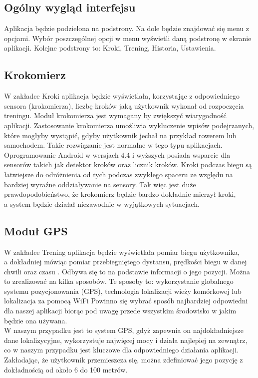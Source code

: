 \subsection{Ogólny wygląd interfejsu}  %

\hspace{0.60cm}Aplikacja będzie podzielona na podstrony. Na dole będzie znajdować się menu z opcjami. Wybór poszczególnej opcji w menu wyświetli daną podstronę w ekranie aplikacji. Kolejne podstrony to: Kroki, Trening, Historia, Ustawienia.

\subsection{Krokomierz}  %

\hspace{0.60cm}W zakładce Kroki aplikacja będzie wyświetlała, korzystając z odpowiedniego sensora (krokomierza), liczbę kroków jaką użytkownik wykonał od rozpoczęcia treningu. Moduł krokomierza jest wymagany by zwiększyć wiarygodność aplikacji. Zastosowanie krokomierza umożliwia wykluczenie wpisów podejrzanych, które mogłyby wystąpić, gdyby użytkownik jechał na przykład rowerem lub samochodem. Takie rozwiązanie jest normalne w tego typu aplikacjach. Oprogramowanie Android w wersjach 4.4 i wyższych posiada wsparcie dla sensorów takich jak detektor kroków oraz licznik kroków. Kroki podczas biegu są łatwiejsze do odróżnienia od tych podczas zwykłego spaceru ze względu na bardziej wyraźne oddziaływanie na sensory. Tak więc jest duże prawdopodobieństwo, że krokomierz będzie bardzo dokładnie mierzył kroki, \\a system będzie działał niezawodnie w wyjątkowych sytuacjach.

\subsection{Moduł GPS}  %

\hspace{0.60cm}W zakładce Trening aplikacja będzie wyświetlała pomiar biegu użytkownika, \\ a dokładniej mówiąc pomiar przebiegniętego dystansu, prędkości biegu w danej chwili oraz czasu . Odbywa się to na podstawie informacji o jego pozycji. Można to zrealizować na kilka sposobów. Te sposoby to: wykorzystanie globalnego systemu pozycjonowania (GPS), technologia lokalizacji wieży komórkowej lub lokalizacja za pomocą WiFi Powinno się wybrać sposób najbardziej odpowiedni dla naszej aplikacji biorąc pod uwagę przede wszystkim środowisko w jakim będzie ona używana. \\ 
W naszym przypadku jest to system GPS, gdyż zapewnia on najdokładniejsze dane lokalizycyjne, wykorzystuje najwięcej mocy i działa najlepiej na zewnątrz, co w naszym przypadku jest kluczowe dla odpowiedniego działania aplikacji. Zakładając, że użytkownik przemieszcza się, można zdefiniować jego pozycję z dokładnością od około 6 do 100 metrów.

